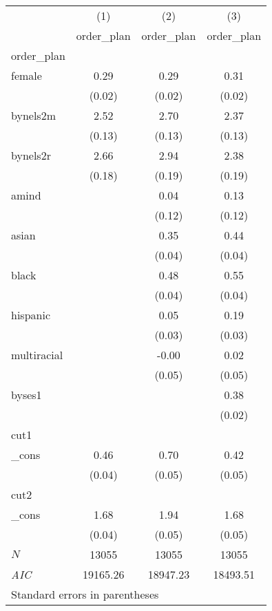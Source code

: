 \begin{tabular}{l*{3}{c}}
\hline\hline
            &\multicolumn{1}{c}{(1)}&\multicolumn{1}{c}{(2)}&\multicolumn{1}{c}{(3)}\\
            &\multicolumn{1}{c}{order\_plan}&\multicolumn{1}{c}{order\_plan}&\multicolumn{1}{c}{order\_plan}\\
\hline
order\_plan  &            &            &            \\
female      &        0.29&        0.29&        0.31\\
            &      (0.02)&      (0.02)&      (0.02)\\
[1em]
bynels2m    &        2.52&        2.70&        2.37\\
            &      (0.13)&      (0.13)&      (0.13)\\
[1em]
bynels2r    &        2.66&        2.94&        2.38\\
            &      (0.18)&      (0.19)&      (0.19)\\
[1em]
amind       &            &        0.04&        0.13\\
            &            &      (0.12)&      (0.12)\\
[1em]
asian       &            &        0.35&        0.44\\
            &            &      (0.04)&      (0.04)\\
[1em]
black       &            &        0.48&        0.55\\
            &            &      (0.04)&      (0.04)\\
[1em]
hispanic    &            &        0.05&        0.19\\
            &            &      (0.03)&      (0.03)\\
[1em]
multiracial &            &       -0.00&        0.02\\
            &            &      (0.05)&      (0.05)\\
[1em]
byses1      &            &            &        0.38\\
            &            &            &      (0.02)\\
\hline
cut1        &            &            &            \\
\_cons      &        0.46&        0.70&        0.42\\
            &      (0.04)&      (0.05)&      (0.05)\\
\hline
cut2        &            &            &            \\
\_cons      &        1.68&        1.94&        1.68\\
            &      (0.04)&      (0.05)&      (0.05)\\
\hline
\(N\)       &       13055&       13055&       13055\\
\textit{AIC}&    19165.26&    18947.23&    18493.51\\
\hline\hline
\multicolumn{4}{l}{\footnotesize Standard errors in parentheses}\\
\end{tabular}
